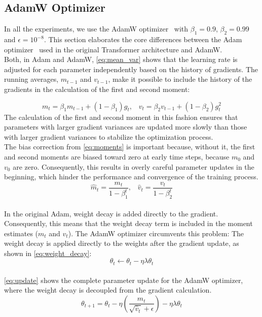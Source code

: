 \subsection{AdamW Optimizer}
In all the experiments, we use the AdamW optimizer~\cite{loshchilov2019decoupledweightdecayregularization} with \(\beta_1=0.9\), \(\beta_2=0.99\) and \(\epsilon=10^{-8}\).
This section elaborates the core differences between the Adam optimizer~\cite{kingma2017adammethodstochasticoptimization} used in the original Transformer architecture and AdamW.\\
Both, in Adam and AdamW, \cref{eq:mean_var} shows that the learning rate is adjusted for each parameter independently based on the history of gradients.
The running averages, \(m_{t-1}\) and \(v_{t-1}\), make it possible to include the history of the gradients in the calculation of the first and second moment:

\begin{equation}
\label{eq:mean_var}
m_t = \beta_1 m_{t-1} + (1 - \beta_1) g_t \text{,} \quad v_t = \beta_2 v_{t-1} + (1 - \beta_2) g_t^2
\end{equation}
The calculation of the first and second moment in this fashion ensures that parameters with larger gradient variances are updated more slowly than those with larger gradient variances to stabilize the optimization process. \\
The bias correction from \cref{eq:moments} is important because, without it, the first and second moments are biased toward zero at early time steps, because \(m_0\) and \(v_0\) are zero. Consequently, this results in overly careful parameter updates in the beginning, which hinder the performance and convergence of the training process. \\
\begin{equation}
\hat{m}_t = \frac{m_t}{1 - \beta_1^t} \text{,} \quad \hat{v}_t = \frac{v_t}{1 - \beta_2^t}
\label{eq:moments}
\end{equation}
\\
In the original Adam, weight decay is added directly to the gradient. Consequently, this means that the weight decay term is included in the moment estimates (\(m_t\) and \(v_t\)). The AdamW optimizer circumvents this problem: The weight decay is applied directly to the weights after the gradient update, as shown in \cref{eq:weight_decay}:
\begin{equation}
\label{eq:weight_decay}
\theta_t \leftarrow \theta_t - \eta \lambda \theta_t
\end{equation}
\\
\cref{eq:update} shows the complete parameter update for the AdamW optimizer, where the weight decay is decoupled from the gradient calculation.
\begin{equation}
\label{eq:update}
\theta_{t+1} = \theta_t - \eta \left( \frac{\hat{m}_t}{\sqrt{\hat{v}_t} + \epsilon} \right) - \eta \lambda \theta_t
\end{equation}

